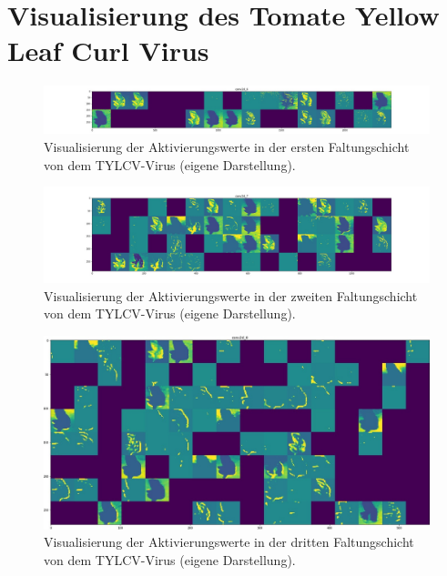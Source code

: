 \chapter{Visualisierung des Tomate Yellow Leaf Curl Virus}
\label{anahngc}
\begin{figure}[h!]
	\centering
	\includegraphics[width=\textwidth]{visualisierungen/yellow/activation/yellow0.JPG}
	\caption{Visualisierung der Aktivierungswerte in der ersten Faltungschicht von dem TYLCV-Virus (eigene Darstellung).}
	\label{}
\end{figure}

\begin{figure}[h!]
	\centering
	\includegraphics[width=\textwidth]{visualisierungen/yellow/activation/yellow3.JPG}
	\caption{Visualisierung der Aktivierungswerte in der zweiten Faltungschicht von dem TYLCV-Virus (eigene Darstellung).}
	\label{}
\end{figure}

\begin{figure}[h!]
	\centering
	\includegraphics[width=\textwidth]{visualisierungen/yellow/activation/yellow6.JPG}
	\caption{Visualisierung der Aktivierungswerte in der dritten Faltungschicht von dem TYLCV-Virus (eigene Darstellung).}
	\label{}
\end{figure}

